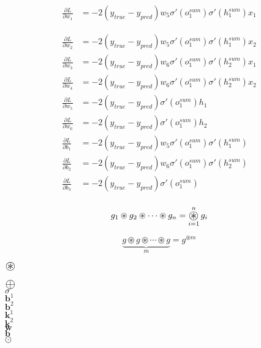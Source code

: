 \documentclass[a4paper,12pt]{article}
\newcommand{\Conv}{%
  \mathop{\scalebox{1.5}{\raisebox{-0.2ex}{$\circledast$}}
  }
}
\newcommand{\Add}{%
  \mathop{\scalebox{1.5}{\raisebox{-0.2ex}{$\oplus$}}
  }
}
\begin{document}
\begin{equation*}
\begin{aligned}
\frac{\partial{L}}{\partial{w_1}} &= -2(y_{true} - y_{pred})w_5\sigma'(o^{sum}_{1})\sigma'(h^{sum}_{1})x_1
\end{aligned}
\end{equation*}


\begin{equation*}
\begin{aligned}
\frac{\partial{L}}{\partial{w_2}} &= -2(y_{true} - y_{pred})w_5\sigma'(o^{sum}_{1})\sigma'(h^{sum}_{1})x_2 \\
\frac{\partial{L}}{\partial{w_3}} &= -2(y_{true} - y_{pred})w_6\sigma'(o^{sum}_{1})\sigma'(h^{sum}_{2})x_1 \\
\frac{\partial{L}}{\partial{w_4}} &= -2(y_{true} - y_{pred})w_6\sigma'(o^{sum}_{1})\sigma'(h^{sum}_{2})x_2 \\[0.3cm]
\frac{\partial{L}}{\partial{w_5}} &= -2(y_{true} - y_{pred})\sigma'(o^{sum}_{1})h_1 \\
\frac{\partial{L}}{\partial{w_6}} &= -2(y_{true} - y_{pred})\sigma'(o^{sum}_{1})h_2 \\[0.3cm]
\frac{\partial{L}}{\partial{b_1}} &= -2(y_{true} - y_{pred})w_5\sigma'(o^{sum}_{1})\sigma'(h^{sum}_{1}) \\
\frac{\partial{L}}{\partial{b_2}} &= -2(y_{true} - y_{pred})w_6\sigma'(o^{sum}_{1})\sigma'(h^{sum}_{2}) \\
\frac{\partial{L}}{\partial{b_3}} &= -2(y_{true} - y_{pred})\sigma'(o^{sum}_{1}) \\
\end{aligned}
\end{equation*}

\[
g_1 \circledast g_2 \circledast \cdots \circledast g_n=\Conv_{i=1}^{n} g_i
\]

\[
\underbrace{g \circledast g \circledast \cdots \circledast g}_{m}=g^{\circledast m}
\]

$\Conv$

$\Add$\\[0.2cm]

$\sigma$\\[0.3cm]

$\boldsymbol{b}^1$\\[0.2cm]
$\boldsymbol{b}^2$\\[0.2cm]
$\boldsymbol{k}^1$\\[0.2cm]
$\boldsymbol{k}^2$\\[0.2cm]
$\boldsymbol{w}$\\[0.2cm]
$\boldsymbol{b}$\\[0.2cm]
$\odot$\\[0.2cm]
\end{document}
